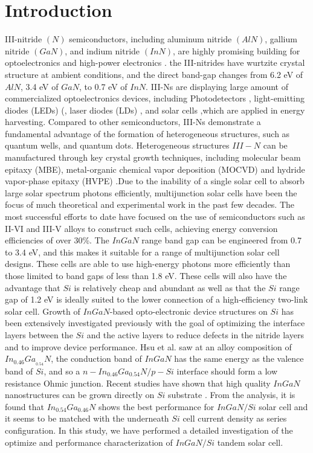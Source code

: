 \documentclass[preprint,12pt]{elsarticle}
\begin{document}
\section{Introduction} \label{sec:Int}
III-nitride $(N)$ semiconductors, including aluminum nitride $(AlN)$, gallium nitride $(GaN)$, and indium nitride $(InN)$, are highly promising building for optoelectronics and high-power electronics \cite{strite1992gan}. the III-nitrides have wurtzite crystal structure at ambient conditions, and the direct band-gap changes from 6.2 eV of $AlN$, 3.4 eV of $GaN$, to 0.7 eV of $InN$. III-Ns are displaying large amount of commercialized optoelectronics devices, including Photodetectors \cite{pernot2000solar,chen1997schottky,munoz1997photoconductor}, light-emitting diodes (LEDs) (\cite{nakamura1993high,funato2006blue,iso2007high}, laser diodes (LDs) \cite{nakamura1998continuous}, and solar cells \cite{neufeld2008high,jani2007design,jiang2017enhanced},which are applied in energy harvesting. Compared to other semiconductors, III-Ns demonstrate a fundamental advantage of the formation of heterogeneous structures, such as quantum wells, and  quantum dots. Heterogeneous structures $III-N$ can be manufactured through key crystal growth techniques, including molecular beam epitaxy (MBE), metal-organic chemical vapor deposition (MOCVD) and hydride vapor-phase epitaxy (HVPE) \cite{jain2000iii,yoshida1982properties,li2007influence}.Due to the inability of a single solar cell to absorb large solar spectrum photons efficiently, multijunction solar cells have been the focus of much theoretical and experimental work in the past few decades. The most successful efforts to date have focused on the use of semiconductors such as II-VI and III-V alloys to construct such cells, achieving energy conversion efficiencies of over 30\%. The $InGaN$ range band gap can be engineered from 0.7 to 3.4 eV, and this makes it suitable for a range of multijunction solar cell designs. These cells are able to use high-energy photons more efficiently than those limited to band gaps of less than 1.8 eV. These cells will also have the advantage that $Si$ is relatively cheap and abundant as well as that the $Si$ range gap of 1.2 eV is ideally suited to the lower connection of a high-efficiency two-link solar cell. Growth of $InGaN$-based opto-electronic device structures on $Si$ has been extensively investigated previously with the goal of optimizing the interface layers between the $Si$ and the active layers to reduce defects in the nitride layers and to improve device performance. Hsu et al.\cite{hsu2008modeling} saw at an alloy composition of $In_{0.46}Ga_{_{0.54}}N$, the conduction band of $InGaN$ has the same energy as the valence band of $Si$, and so a $n-In_{0.46}Ga_{0.54}N/p-Si$ interface should form a low resistance Ohmic junction. Recent studies have shown that high quality $InGaN$ nanostructures can be grown directly on $Si$ substrate \cite{arafin2013review, wang2019in0}. From the analysis, it is found that $In_{0.54}Ga_{0.46}N$ shows the best performance for $InGaN/Si$ solar cell and it seems to be matched with the underneath $Si$ cell current density as series configuration. In this study, we have performed a detailed investigation of the optimize and performance characterization of $InGaN/Si$ tandem solar cell.
\end{document}
